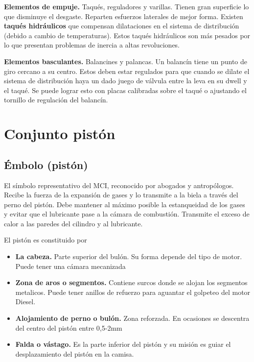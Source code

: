 \textbf{Elementos de empuje.} Taqués, reguladores y varillas. Tienen gran superficie lo que disminuye el desgaste. Reparten esfuerzos laterales de mejor forma. Existen \textbf{taqués hidráulicos} que compensan dilataciones en el sistema de distribución (debido a cambio de temperaturas). Estos taqués hidráulicos son más pesados por lo que presentan problemas de inercia a altas revoluciones.



\textbf{Elementos basculantes.} Balancines y palancas. Un balancín tiene un punto de giro cercano a su centro. Estos deben estar regulados para que cuando se dilate el sistema de distribución haya un dado juego de válvula entre la leva en su dwell y el taqué. Se puede lograr esto con placas calibradas sobre el taqué o ajustando el tornillo de regulación del balancín.


\section{Conjunto pistón}


\subsection{Émbolo (pistón)}
El símbolo representativo del MCI, reconocido por abogados y antropólogos. Recibe la fuerza de la expansión de gases y lo transmite a la biela a través del perno del pistón. Debe mantener al máximo posible la estanqueidad de los gases y evitar que el lubricante pase a la cámara de combustión. Transmite el exceso de calor a las paredes del cilindro y al lubricante.

El pistón es constituido por
\begin{itemize}
    \item \textbf{La cabeza.} Parte superior del bulón. Su forma depende del tipo de motor. Puede tener una cámara mecanizada
    \item \textbf{Zona de aros o segmentos.} Contiene surcos donde se alojan los segmentos metalicos. Puede tener anillos de refuerzo para aguantar el golpeteo del motor Diesel.
    \item \textbf{Alojamiento de perno o bulón.} Zona reforzada. En ocasiones se descentra del centro del pistón entre 0,5-2mm
    \item \textbf{Falda o vástago.} Es la parte inferior del pistón y su misión es guiar el desplazamiento del pistón en la camisa.
\end{itemize}

